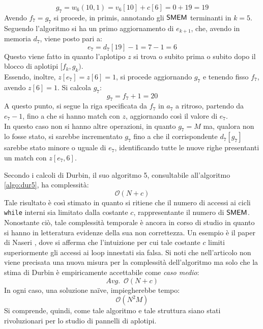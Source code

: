 \begin{esempio}
  \[g_7=w_6(10,1)=v_6[10]+c[6]=0+19=19\]
  Avendo $f_7=g_7$ si procede, in primis, annotando gli $\mbox{\rm {\sf SMEM}}$ terminanti in
  $k=5$.\\
  Seguendo l'algoritmo si ha un primo aggiornamento di $e_{k+1}$, che,
  avendo in memoria $d_7$, viene posto pari a: 
  \[e_7=d_7[19]-1=7-1=6\]
  Questo viene fatto in quanto l'aplotipo $z$ si trova o subito
  prima o subito dopo il blocco di aplotipi $[f_k,g_k)$.\\
  Essendo, inoltre, $z[e_7]=z[6]=1$, si procede aggiornando $g_7$ e tenendo fisso
  $f_7$, avendo $z[6]=1$. Si calcola $g_7$:
  \[g_7=f_7+1=20\]
  A questo punto, si segue la riga specificata da $f_7$ in $a_7$ a ritroso,
  partendo da $e_7-1$, fino a che si hanno match con $z$, aggiornando così il
  valore di $e_7$.\\
  In questo caso non si hanno altre operazioni, in quanto $g_7=M$ ma, qualora
  non lo fosse stato, si sarebbe incrementato $g_7$ fino a che il corrispondente
  $d_7[g_7]$ sarebbe stato minore o uguale di $e_7$, identificando tutte le
  nuove righe presentanti un match con $z[e_7, 6]$.
\end{esempio}
Secondo i
calcoli di Durbin, il suo algoritmo 5,
consultabile all'algoritmo 
\ref{algo:dur5}, ha complessità: 
\begin{equation}
  \label{eq:pbwtsmem5}
  \mathcal{O}(N+c)
\end{equation}
Tale risultato è così stimato in quanto si ritiene che il
numero di accessi ai cicli \texttt{while} interni sia limitato dalla costante
$c$, rappresentante il 
numero di $\mbox{\rm {\sf SMEM}}$. Nonostante ciò, tale complessità temporale è ancora in
corso di studio in quanto si hanno in letteratura evidenze della sua non
correttezza. Un esempio è il paper di Naseri \cite{dpbwt}, dove si afferma che
l'intuizione per cui tale costante $c$ limiti superiormente gli accessi ai loop
innestati sia falsa. Si noti che nell'articolo non viene precisata una
nuova misura per la complessità dell'algoritmo ma solo che la stima di Durbin è
empiricamente accettabile come \textit{caso medio}:
\begin{equation}
  \label{eq:pbwtsmem6}
  Avg.\,\,\,\mathcal{O}(N+c)
\end{equation}
In ogni caso, una soluzione na\"{i}ve, impiegherebbe tempo:
\begin{equation}
  \label{eq:pbwtsmem7}
  \mathcal{O}(N^2M)
\end{equation}
Si comprende, quindi, come tale algoritmo e tale struttura siano stati
rivoluzionari per lo studio di pannelli di aplotipi.
